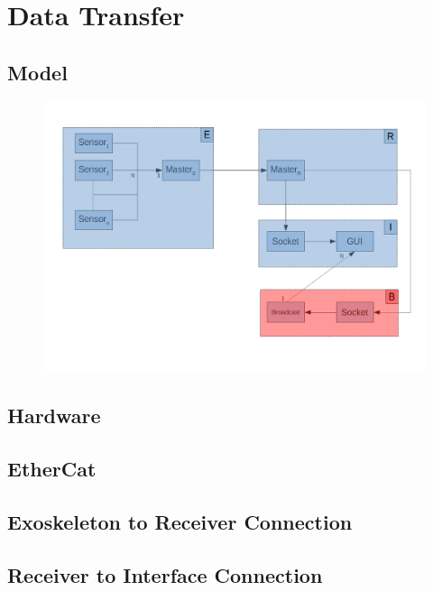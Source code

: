 \section{Data Transfer}
\subsection{Model}
\begin{figure}[!hg]
	\includegraphics[width=500px]{ERBI-Model}
\end{figure}
\subsection{Hardware}
\subsection{EtherCat}
\subsection{Exoskeleton to Receiver Connection}
\subsection{Receiver to Interface Connection}